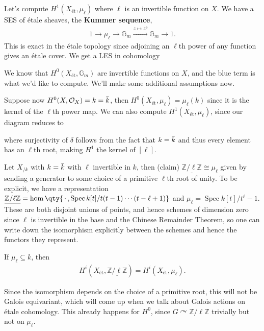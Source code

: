 \begin{example}[?]

Let's compute \(H^1(X_\text{ét}, \mu_\ell)\) where \(\ell\) is an
invertible function on \(X\). We have a SES of étale sheaves, the
\textbf{Kummer sequence},
\begin{align*}  
1 \to \mu_\ell \to {\mathbb{G}}_m \xrightarrow{z\mapsto z^p} {\mathbb{G}}_m \to 1
.\end{align*}
This is exact in the étale topology since adjoining an \(\ell\)th power
of any function gives an étale cover. We get a LES in cohomology

We know that \(H^0(X_\text{ét}, {\mathbb{G}}_m)\) are invertible
functions on \(X\), and the blue term is what we'd like to compute.
We'll make some additional assumptions now.

Suppose now
\(H^0(X, {\mathcal{O}}_X) = k = \mkern 1.5mu\overline{\mkern-1.5muk\mkern-1.5mu}\mkern 1.5mu\),
then \(H^0(X_\text{ét},\mu_\ell) = \mu_\ell(k)\) since it is the kernel
of the \(\ell\)th power map. We can also compute
\(H^1(X_\text{ét}, \mu_\ell)\), since our diagram reduces to

where surjectivity of \(\delta\) follows from the fact that
\(k=\mkern 1.5mu\overline{\mkern-1.5muk\mkern-1.5mu}\mkern 1.5mu\) and
thus every element has an \(\ell\)th root, making \(H^1\) the kernel of
\([\ell]\).

\end{example}

\begin{example}[?]

Let \(X_{/k}\) with
\(k=\mkern 1.5mu\overline{\mkern-1.5muk\mkern-1.5mu}\mkern 1.5mu\) with
\(\ell\) invertible in \(k\), then (claim)
\(\underline{\mathbb{Z}/\ell\mathbb{Z}}\cong \mu_\ell\) given by sending
a generator to some choice of a primitive \(\ell\)th root of unity. To
be explicit, we have a representation
\(\underline{\mathbb{Z}/\ell\mathbb{Z}}= \hom \qty{ {\,\cdot\,}, \operatorname{Spec}k[t] / t(t-1) \cdots (t-\ell+1) }\)
and \(\mu_\ell = \operatorname{Spec}k[t] / t^\ell-1\). These are both
disjoint unions of points, and hence schemes of dimension zero since
\(\ell\) is invertible in the base and the Chinese Remainder Theorem, so
one can write down the isomorphism explicitly between the schemes and
hence the functors they represent.

\begin{corollary}[?]

If \(\mu_\ell \subseteq k\), then
\begin{align*}  
H^i(X_\text{ét}, \underline{\mathbb{Z}/\ell\mathbb{Z}}) = 
H^i(X_\text{ét}, \mu_\ell)
.\end{align*}

\end{corollary}

Since the isomorphism depends on the choice of a primitive root, this
will not be Galois equivariant, which will come up when we talk about
Galois actions on étale cohomology. This already happens for \(H^0\),
since \(G\curvearrowright\mathbb{Z}/\ell\mathbb{Z}\) trivially but not
on \(\mu_\ell\).

\end{example}

